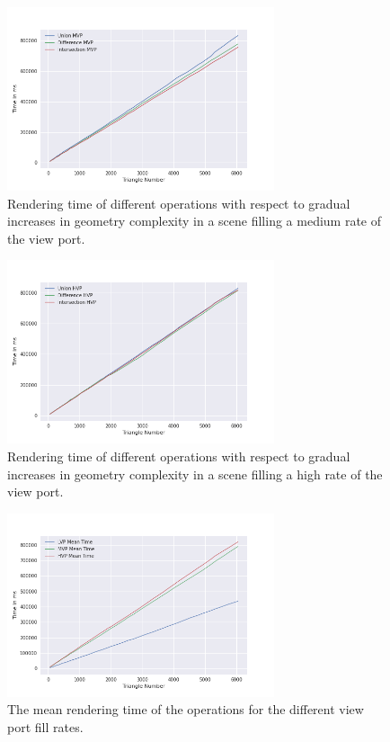\documentclass[a4paper,11pt,oneside]{article}
\begin{document}
\begin{figure}[H]
	\centering
	\includegraphics[width=0.7\textwidth]{section5/plots/bin_csg_mvp.png}
	\caption{Rendering time of different operations with respect to gradual increases in geometry complexity in a scene filling a medium rate of the view port.}
	\label{sec5.1:bin_operations_mvp}
\end{figure}

\begin{figure}[H]
	\centering
	\includegraphics[width=0.7\textwidth]{section5/plots/bin_csg_hvp.png}
	\caption{Rendering time of different operations with respect to gradual increases in geometry complexity in a scene filling a high rate of the view port.}
	\label{sec5.1:bin_operations_hvp}
\end{figure}

\begin{figure}[H]
	\centering
	\includegraphics[width=0.7\textwidth]{section5/plots/bin_csg_mean.png}
	\caption{The mean rendering time of the operations for the different view port fill rates.}
	\label{sec5.1:bin_operations}
\end{figure}
\end{document}
